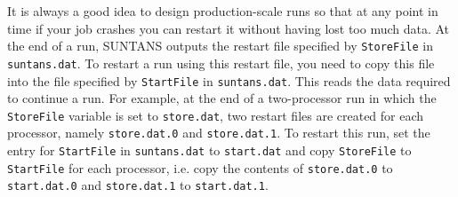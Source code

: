 \documentclass[12pt,oneside]{article}
\begin{document}
It is always a good idea to design production-scale runs so that at any point in time if your
job crashes you can restart it without having lost too much data.  At the end of a run, SUNTANS
outputs the restart file specified by \verb+StoreFile+ in \verb+suntans.dat+.  To restart a run using
this restart file, you need to copy this file into the file specified by \verb+StartFile+ in \verb+suntans.dat+.
This reads the data required to continue a run.  For example, at the end of a two-processor run in which
the \verb+StoreFile+ variable is set to \verb+store.dat+, two restart files are created for each processor, 
namely \verb+store.dat.0+ and \verb+store.dat.1+.  To restart this run, set the entry for \verb+StartFile+ in
\verb+suntans.dat+ to \verb+start.dat+ and copy \verb+StoreFile+ to \verb+StartFile+ for each processor, i.e.
copy the contents of \verb+store.dat.0+ to \verb+start.dat.0+ and \verb+store.dat.1+ to \verb+start.dat.1+.
\end{document}

